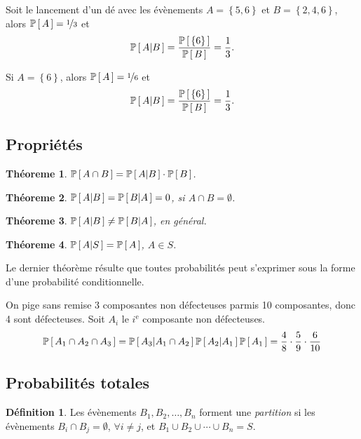 \documentclass[11pt]{article}
\makeatletter
\renewcommand\P[1]{%
	\ensuremath{%
		\mathbb{P}\left[\,#1\,\right]%
	}%
}%
\newcommand\Pg[2]{%
	\ensuremath{%
		\mathbb{P}\left[\,#1\middle\rvert#2\,\right]%
	}%
}%
\newtheorem{theoreme}{Théoreme}[section]
\theoremstyle{remark}
\theoremstyle{definition}
\newtheorem*{@definition}{Définition}
\newenvironment{definition}{%
	\begin{@definition}%
}{%
	\end{@definition}%
	\setcounter{property}{0}%
}
\makeatother
\begin{document}
\begin{exemple}
	Soit le lancement d'un dé avec les évènements $A=\left\{5,6\right\}$ et
	$B=\left\{2,4,6\right\}$, alors $\P{A}=\nicefrac{1}{3}$ et 
	\begin{equation*}
		\Pg{A}{B}=\frac{\P{\left\{6\right\}}}{\P{B}}=\frac{1}{3}.
	\end{equation*}

	Si $A=\left\{6\right\}$, alors $\P{A}=\nicefrac{1}{6}$ et
	\begin{equation*}
		\Pg{A}{B}=\frac{\P{\left\{6\right\}}}{\P{B}}=\frac{1}{3}.
	\end{equation*}
\end{exemple}

\subsection{Propriétés}
\begin{theoreme}
	$\P{A\cap B}=\Pg{A}{B}\cdot\P{B}$.
\end{theoreme}

\begin{theoreme}
	$\Pg{A}{B}=\Pg{B}{A}=0$, si $A\cap B=\emptyset$.
\end{theoreme}

\begin{theoreme}
	$\Pg{A}{B}\neq\Pg{B}{A}$, en général.
\end{theoreme}

\begin{theoreme}
	$\Pg{A}{S}=\P{A}$, $A\in S$.
\end{theoreme}

Le dernier théorème résulte que toutes probabilités peut s'exprimer sous la
forme d'une probabilité conditionnelle.

\begin{exemple}
	On pige sans remise 3 composantes non défecteuses parmis 10 composantes, donc 4 sont
	défecteuses. Soit $A_i$ le $i^\text{e}$ composante non défecteuses.
	\begin{equation*}
		\P{A_1\cap A_2\cap A_3}=\Pg{A_3}{A_1\cap A_2}\Pg{A_2}{A_1}\P{A_1}
		=\frac{4}{8}\cdot\frac{5}{9}\cdot\frac{6}{10}
	\end{equation*}
\end{exemple}

\subsection{Probabilités totales}
\begin{definition}
	Les évènements $B_1,B_2,\dots,B_n$ forment une \textit{partition} si les
	évènements $B_i\cap B_j=\emptyset$, $\forall i\neq j$, et
	$B_1\cup B_2\cup\cdots\cup B_n=S$.
\end{definition}
\end{document}
